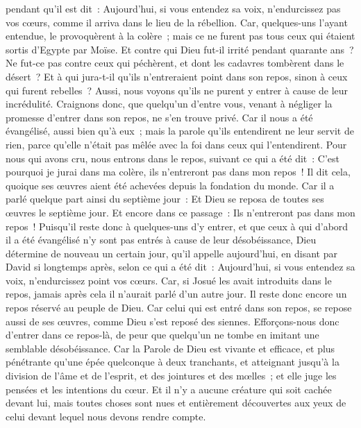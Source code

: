 \begin{multicols}{2}
pendant qu'il est dit~: Aujourd'hui, si vous entendez sa voix, n'endurcissez pas vos cœurs, comme il arriva dans le lieu de la rébellion.
Car, quelques-uns l'ayant entendue, le provoquèrent à la colère~; mais ce ne furent pas tous ceux qui étaient sortis d'Egypte par Moïse. 
Et contre qui Dieu fut-il irrité pendant quarante ans~? Ne fut-ce pas contre ceux qui péchèrent, et dont les cadavres tombèrent dans le désert~?
Et à qui jura-t-il qu'ils n'entreraient point dans son repos, sinon à ceux qui furent rebelles~?
Aussi, nous voyons qu'ils ne purent y entrer à cause de leur incrédulité.
\VerseOne{}Craignons donc, que quelqu'un d'entre vous, venant à négliger la promesse d'entrer dans son repos, ne s'en trouve privé.
Car il nous a été évangélisé, aussi bien qu'à eux~; mais la parole qu'ils entendirent ne leur servit de rien, parce qu'elle n'était pas mêlée avec la foi dans ceux qui l'entendirent.
Pour nous qui avons cru, nous entrons dans le repos, suivant ce qui a été dit~: C'est pourquoi je jurai dans ma colère, ils n'entreront pas dans mon repos~! Il dit cela, quoique ses œuvres aient été achevées depuis la fondation du monde.
Car il a parlé quelque part ainsi du septième jour~: Et Dieu se reposa de toutes ses œuvres le septième jour.
Et encore dans ce passage~: Ils n'entreront pas dans mon repos~!
Puisqu'il reste donc à quelques-uns d'y entrer, et que ceux à qui d'abord il a été évangélisé n'y sont pas entrés à cause de leur désobéissance,
Dieu détermine de nouveau un certain jour, qu'il appelle aujourd'hui, en disant par David si longtemps après, selon ce qui a été dit~: Aujourd'hui, si vous entendez sa voix, n'endurcissez point vos cœurs.
Car, si Josué les avait introduits dans le repos, jamais après cela il n'aurait parlé d'un autre jour.
Il reste donc encore un repos réservé au peuple de Dieu.
Car celui qui est entré dans son repos, se repose aussi de ses œuvres, comme Dieu s'est reposé des siennes.
Efforçons-nous donc d'entrer dans ce repos-là, de peur que quelqu'un ne tombe en imitant une semblable désobéissance.
Car la Parole de Dieu est vivante et efficace, et plus pénétrante qu'une épée quelconque à deux tranchants, et atteignant jusqu'à la division de l'âme et de l'esprit, et des jointures et des mœlles~; et elle juge les pensées et les intentions du cœur.
Et il n'y a aucune créature qui soit cachée devant lui, mais toutes choses sont nues et entièrement découvertes aux yeux de celui devant lequel nous devons rendre compte.

\end{multicols}
